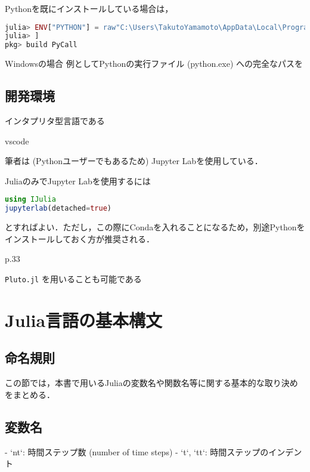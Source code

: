 \documentclass[titlepage]{ltjsbook}
\newcommand{\jl}{\lstinline[language=julia]}
\begin{document}
Pythonを既にインストールしている場合は，

\begin{lstlisting}[language=julia]
julia> ENV["PYTHON"] = raw"C:\Users\TakutoYamamoto\AppData\Local\Programs\Python\Python312\python.exe"
julia> ]
pkg> build PyCall
\end{lstlisting}

Windowsの場合
例としてPythonの実行ファイル (python.exe) への完全なパスを


\subsection{開発環境}

インタプリタ型言語である

vscode

筆者は (Pythonユーザーでもあるため) Jupyter Labを使用している．

JuliaのみでJupyter Labを使用するには

\begin{lstlisting}[language=julia]
using IJulia
jupyterlab(detached=true)
\end{lstlisting}

とすればよい．ただし，この際にCondaを入れることになるため，別途Pythonをインストールしておく方が推奨される．

p.33

\jl{Pluto.jl} を用いることも可能である

\section{Julia言語の基本構文}


\subsection{命名規則}
この節では，本書で用いるJuliaの変数名や関数名等に関する基本的な取り決めをまとめる．

\subsection{変数名}
- `nt`: 時間ステップ数 (number of time steps)
- `t`, `tt`: 時間ステップのインデント

\printbibliography[segment=\therefsegment,heading=subbibliography,title={参考文献}]
\end{document}
